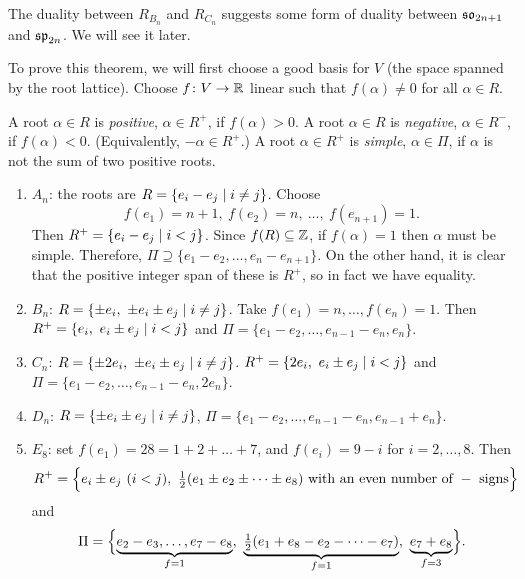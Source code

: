 \begin{remark}
The duality between $R_{B_n}$ and $R_{C_n}$ suggests some form of duality
between $\mathfrak{so}_{2n+1}$ and $\mathfrak{sp}_{2n}$. We will see it later.
\end{remark}

To prove this theorem, we will first choose a good basis for $V$ (the space
spanned by the root lattice). Choose $f\colon V \to \mathbb{R}$ linear such that
$f(\alpha) \neq 0$ for all $\alpha \in R$.

\begin{definition}
A root $\alpha \in R$ is \emph{positive}, $\alpha \in R^+$, if $f(\alpha) > 0$.
A root $\alpha \in R$ is \emph{negative}, $\alpha \in R^-$, if $f(\alpha) < 0$.
(Equivalently, $-\alpha \in R^+$.) A root $\alpha \in R^+$ is \emph{simple},
$\alpha \in \Pi$, if $\alpha$ is not the sum of two positive roots.
\end{definition}

\begin{example}\leavevmode
\begin{enumerate}
  \item $A_n$: the roots are $R = \{e_i - e_j \mid i \neq j\}$. Choose
    \[
      f(e_1) = n + 1,\ f(e_2) = n,\ \dots,\ f(e_{n+1}) = 1.
    \]
    Then $R^+ = \{e_i - e_j \mid i < j\}$. Since $f(R) \subseteq \mathbb{Z}$, if
    $f(\alpha) = 1$ then $\alpha$ must be simple. Therefore,
    $\Pi \supseteq \{e_1 - e_2, \dots, e_n - e_{n+1}\}$. On the other hand, it
    is clear that the positive integer span of these is $R^+$, so in fact we
    have equality.
  \item $B_n$: $R = \{\pm e_i,\ \pm e_i \pm e_j \mid i \neq j\}$. Take
    $f(e_1) = n, \dots, f(e_n) = 1$. Then
    $R^+ = \{e_i,\ e_i \pm e_j \mid i < j\}$ and
    $\Pi = \{e_1 - e_2, \dots, e_{n-1} - e_n, e_n\}$.
  \item $C_n$: $R = \{\pm 2e_i,\ \pm e_i \pm e_j \mid i \neq j\}$.
    $R^+ = \{2e_i,\ e_i \pm e_j \mid i < j\}$ and
    $\Pi = \{e_1 - e_2, \dots, e_{n-1} - e_n, 2e_n\}$.
  \item $D_n$: $R = \{\pm e_i \pm e_j \mid i \neq j\}$,
    $\Pi = \{e_1 - e_2, \dots, e_{n-1} - e_n, e_{n-1} + e_n\}$.
  \item $E_8$: set $f(e_1) = 28 = 1 + 2 + \dots + 7$, and $f(e_i) = 9 - i$ for
    $i = 2, \dots, 8$. Then
    \[
      R^+ = \Bigl\{e_i \pm e_j\ (i < j),\ \tfrac12(e_1 \pm e_2 \pm \dots \pm e_8)
        \text{ with an even number of } - \text{ signs}\Bigr\}
    \]
    and
    \[
      \Pi = \Bigl\{\underbrace{e_2 - e_3, \dots, e_7 - e_8}_{f = 1},\
        \underbrace{\tfrac12(e_1 + e_8 - e_2 - \dots - e_7)}_{f = 1},\
        \underbrace{e_7 + e_8}_{f = 3}\Bigr\}.
    \]
\end{enumerate}
\end{example}

